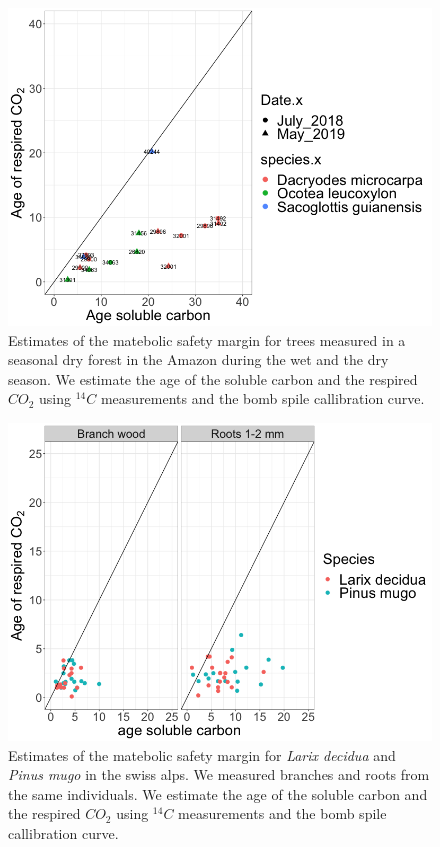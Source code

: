 \documentclass{article}
\begin{document}
 \begin{figure}[h] %
   \centering
   \includegraphics[width=5in]{Tanguro_trees_wet_dry_season.png} 
   \caption{Estimates of the matebolic safety margin for trees measured in a seasonal dry forest in the Amazon during the wet and the dry season. We estimate the age of the soluble carbon and the respired $CO_{2}$ using $^{14}C$ measurements and the bomb spile callibration curve.}
   \label{fig:14C_measurements}
\end{figure}

\begin{figure}[h] %
   \centering
   \includegraphics[width=5in]{Sweeden_trees_branch_fineroots.png} 
   \caption{Estimates of the matebolic safety margin for \textit{Larix decidua} and \textit{Pinus mugo} in the swiss alps. We measured branches and roots from the same individuals. We estimate the age of the soluble carbon and the respired $CO_{2}$ using $^{14}C$ measurements and the bomb spile callibration curve.}
   \label{fig:14C_measurements_sweeden}
\end{figure}
\end{document}
